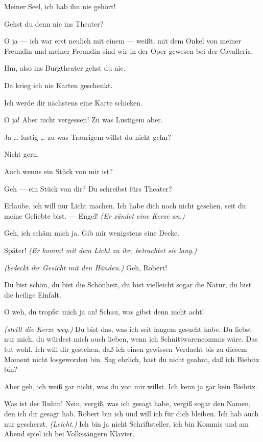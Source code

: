 \documentclass[
	final,
	a4paper,
	ngerman,
	mpinclude = true, %
	twoside = true,
	open = right,
	cleardoublepage = plain,
	DIV = 13,
	BCOR = 1cm,
	titlepage = firstiscover,
	]{scrbook}
\newcommand{\direction}[1]{\textit{(#1)}}
\newcommand{\thecharacter}[1]{\textup{\textsc{#1}}}
\newcommand{\thesuesse}{\thecharacter{Süßes Mädel}}
\newcommand{\thedichter}{\thecharacter{Dichter}}
\newcommand{\character}[1]{\item[#1:]}
\newcommand{\suesse}{\character{\thesuesse}}
\newcommand{\dichter}{\character{\thedichter}}
\begin{document}
\begin{play}
	\suesse
	Meiner Seel, ich hab ihn nie gehört!

	\dichter
	Gehst du denn nie ins Theater?

	\suesse
	O ja --- ich war erst neulich mit einem --- weißt, mit dem Onkel von meiner Freundin und meiner Freundin sind wir in der Oper gewesen bei der Cavalleria.

	\dichter
	Hm, also ins Burgtheater gehst du nie.

	\suesse
	Da krieg ich nie Karten geschenkt.

	\dichter
	Ich werde dir nächstens eine Karte schicken.

	\suesse
	O ja! Aber nicht vergessen! Zu was Lustigem aber.

	\dichter
	Ja \ldots{} lustig \ldots{} zu was Traurigem willst du nicht gehn?

	\suesse
	Nicht gern.

	\dichter
	Auch wenns ein Stück von mir ist?

	\suesse
	Geh --- ein Stück von dir? Du schreibst fürs Theater?

	\dichter
	Erlaube, ich will nur Licht machen. Ich habe dich noch nicht gesehen, seit du meine Geliebte bist. --- Engel! \direction{Er zündet eine Kerze an.}

	\suesse
	Geh, ich schäm mich ja. Gib mir wenigstens eine Decke.

	\dichter
	Später! \direction{Er kommt mit dem Licht zu ihr, betrachtet sie lang.}

	\suesse
	\direction{bedeckt ihr Gesicht mit den Händen.} Geh, Robert!

	\dichter
	Du bist schön, du bist die Schönheit, du bist vielleicht sogar die Natur, du bist die heilige Einfalt.

	\suesse
	O weh, du tropfst mich ja an! Schau, was gibst denn nicht acht!

	\dichter
	\direction{stellt die Kerze weg.} Du bist das, was ich seit langem gesucht habe. Du liebst nur mich, du würdest mich auch lieben, wenn ich Schnittwarencommis wäre. Das tut wohl. Ich will dir gestehen, daß ich einen gewissen Verdacht bis zu diesem Moment nicht losgeworden bin. Sag ehrlich, hast du nicht geahnt, daß ich Biebitz bin?

	\suesse
	Aber geh, ich weiß gar nicht, was du von mir willst. Ich kenn ja gar kein Biebitz.

	\dichter
	Was ist der Ruhm! Nein, vergiß, was ich gesagt habe, vergiß sogar den Namen, den ich dir gesagt hab. Robert bin ich und will ich für dich bleiben. Ich hab auch nur gescherzt. \direction{Leicht.} Ich bin ja nicht Schriftsteller, ich bin Kommis und am Abend spiel ich bei Volkssängern Klavier.


\end{play}
\end{document}
